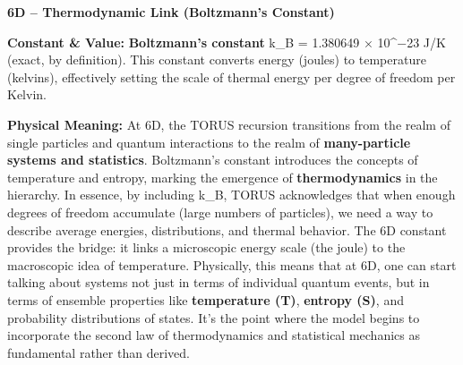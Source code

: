 \textbf{6D -- Thermodynamic Link (Boltzmann's Constant)}

\textbf{Constant \& Value:} \textbf{Boltzmann's constant} k\_B =
1.380649 × 10\^{}−23 J/K (exact, by definition)​. This constant converts
energy (joules) to temperature (kelvins), effectively setting the scale
of thermal energy per degree of freedom per Kelvin.

\textbf{Physical Meaning:} At 6D, the TORUS recursion transitions from
the realm of single particles and quantum interactions to the realm of
\textbf{many-particle systems and statistics}. Boltzmann's constant
introduces the concepts of temperature and entropy, marking the
emergence of \textbf{thermodynamics} in the hierarchy​. In essence, by
including k\_B, TORUS acknowledges that when enough degrees of freedom
accumulate (large numbers of particles), we need a way to describe
average energies, distributions, and thermal behavior. The 6D constant
provides the bridge: it links a microscopic energy scale (the joule) to
the macroscopic idea of temperature. Physically, this means that at 6D,
one can start talking about systems not just in terms of individual
quantum events, but in terms of ensemble properties like
\textbf{temperature (T)}, \textbf{entropy (S)}, and probability
distributions of states. It's the point where the model begins to
incorporate the second law of thermodynamics and statistical mechanics
as fundamental rather than derived.

